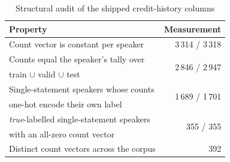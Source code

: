 \begin{table}[t]
\caption{Structural audit of the shipped credit-history columns}
\label{tab:audit}
\centering
\footnotesize
\begin{tabular}{@{}lr@{}}
\toprule
Property & Measurement \\
\midrule
Count vector is constant per speaker & 3\,314 / 3\,318 \\
Counts equal the speaker's tally over & \multirow{2}{*}{2\,846 / 2\,947} \\
\quad train $\cup$ valid $\cup$ test & \\
Single-statement speakers whose counts & \multirow{2}{*}{1\,689 / 1\,701} \\
\quad one-hot encode their own label & \\
\emph{true}-labelled single-statement speakers & \multirow{2}{*}{355 / 355} \\
\quad with an all-zero count vector & \\
Distinct count vectors across the corpus & 392 \\
\bottomrule
\end{tabular}
\end{table}
